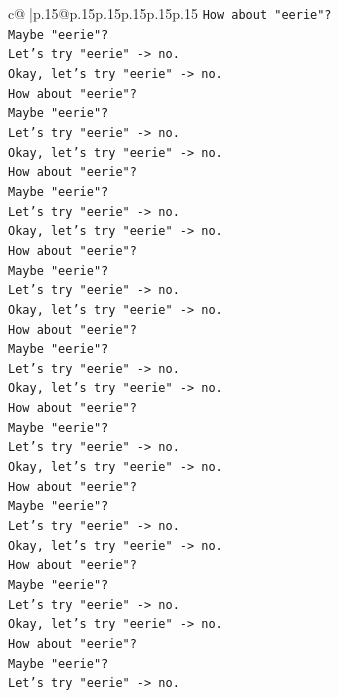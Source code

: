 \documentclass{article}
\begin{document}
{\begin{supertabular}{c@{$\;$}|p{.15\linewidth}@{}p{.15\linewidth}p{.15\linewidth}p{.15\linewidth}p{.15\linewidth}p{.15\linewidth}}
{{{\texttt{How about "eerie"?} \\
\texttt{Maybe "eerie"?} \\
\texttt{Let's try "eerie" {-}> no.} \\
\texttt{Okay, let's try "eerie" {-}> no.} \\
\texttt{How about "eerie"?} \\
\texttt{Maybe "eerie"?} \\
\texttt{Let's try "eerie" {-}> no.} \\
\texttt{Okay, let's try "eerie" {-}> no.} \\
\texttt{How about "eerie"?} \\
\texttt{Maybe "eerie"?} \\
\texttt{Let's try "eerie" {-}> no.} \\
\texttt{Okay, let's try "eerie" {-}> no.} \\
\texttt{How about "eerie"?} \\
\texttt{Maybe "eerie"?} \\
\texttt{Let's try "eerie" {-}> no.} \\
\texttt{Okay, let's try "eerie" {-}> no.} \\
\texttt{How about "eerie"?} \\
\texttt{Maybe "eerie"?} \\
\texttt{Let's try "eerie" {-}> no.} \\
\texttt{Okay, let's try "eerie" {-}> no.} \\
\texttt{How about "eerie"?} \\
\texttt{Maybe "eerie"?} \\
\texttt{Let's try "eerie" {-}> no.} \\
\texttt{Okay, let's try "eerie" {-}> no.} \\
\texttt{How about "eerie"?} \\
\texttt{Maybe "eerie"?} \\
\texttt{Let's try "eerie" {-}> no.} \\
\texttt{Okay, let's try "eerie" {-}> no.} \\
\texttt{How about "eerie"?} \\
\texttt{Maybe "eerie"?} \\
\texttt{Let's try "eerie" {-}> no.} \\
\texttt{Okay, let's try "eerie" {-}> no.} \\
\texttt{How about "eerie"?} \\
\texttt{Maybe "eerie"?} \\
\texttt{Let's try "eerie" {-}> no.} \\
}}}
\end{supertabular}}
\end{document}
